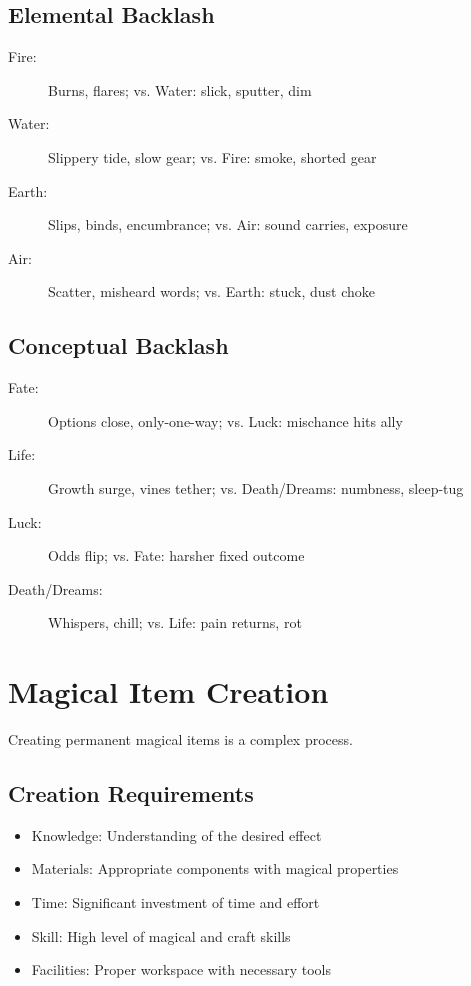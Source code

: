 \documentclass[11pt,twoside,openany]{book}
\begin{document}
\subsection*{Elemental Backlash}

\begin{description}
\item[Fire:] Burns, flares; vs. Water: slick, sputter, dim
\item[Water:] Slippery tide, slow gear; vs. Fire: smoke, shorted gear
\item[Earth:] Slips, binds, encumbrance; vs. Air: sound carries, exposure
\item[Air:] Scatter, misheard words; vs. Earth: stuck, dust choke
\end{description}

\subsection*{Conceptual Backlash}

\begin{description}
\item[Fate:] Options close, only-one-way; vs. Luck: mischance hits ally
\item[Life:] Growth surge, vines tether; vs. Death/Dreams: numbness, sleep-tug
\item[Luck:] Odds flip; vs. Fate: harsher fixed outcome
\item[Death/Dreams:] Whispers, chill; vs. Life: pain returns, rot
\end{description}

\section*{Magical Item Creation} 

Creating permanent magical items is a complex process.

\subsection*{Creation Requirements}

\begin{itemize}
\item Knowledge: Understanding of the desired effect
\item Materials: Appropriate components with magical properties
\item Time: Significant investment of time and effort
\item Skill: High level of magical and craft skills
\item Facilities: Proper workspace with necessary tools
\end{itemize}
\end{document}
